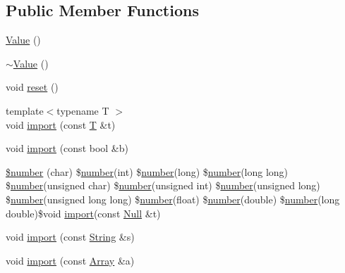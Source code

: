 \subsection*{Public Member Functions}
\begin{DoxyCompactItemize}
\item 
\hyperlink{classjsonxx_1_1_value_a57931515270809031ef1add1665a4cfd}{Value} ()
\item 
\hyperlink{classjsonxx_1_1_value_af789a314d0a4a9c98b64ec9325ac61e4}{$\sim$\+Value} ()
\item 
void \hyperlink{classjsonxx_1_1_value_ae02ba9a56af7a601ea2f2879d068153e}{reset} ()
\item 
{\footnotesize template$<$typename T $>$ }\\void \hyperlink{classjsonxx_1_1_value_ad12e7a5b0cb284a7ccdd3daf446091af}{import} (const \hyperlink{http__parser_8c_ad24d0de3f597ca60dd95c4bc59c2ff73}{T} \&t)
\item 
void \hyperlink{classjsonxx_1_1_value_ae78fbbab5fda5a42b854ca9d4d52a5eb}{import} (const bool \&b)
\item 
\hyperlink{classjsonxx_1_1_value_a8316ec94dc82e1f7affeea6ca9d7ac28}{\$number} (char) \$\hyperlink{msg__server_2jsonxx_8h_a590bcfd46c7e83d5b834775f77aa42a3}{number}(int) \$\hyperlink{msg__server_2jsonxx_8h_a590bcfd46c7e83d5b834775f77aa42a3}{number}(long) \$\hyperlink{msg__server_2jsonxx_8h_a590bcfd46c7e83d5b834775f77aa42a3}{number}(long long) \$\hyperlink{msg__server_2jsonxx_8h_a590bcfd46c7e83d5b834775f77aa42a3}{number}(unsigned char) \$\hyperlink{msg__server_2jsonxx_8h_a590bcfd46c7e83d5b834775f77aa42a3}{number}(unsigned int) \$\hyperlink{msg__server_2jsonxx_8h_a590bcfd46c7e83d5b834775f77aa42a3}{number}(unsigned long) \$\hyperlink{msg__server_2jsonxx_8h_a590bcfd46c7e83d5b834775f77aa42a3}{number}(unsigned long long) \$\hyperlink{msg__server_2jsonxx_8h_a590bcfd46c7e83d5b834775f77aa42a3}{number}(float) \$\hyperlink{msg__server_2jsonxx_8h_a590bcfd46c7e83d5b834775f77aa42a3}{number}(double) \$\hyperlink{msg__server_2jsonxx_8h_a590bcfd46c7e83d5b834775f77aa42a3}{number}(long double)\$void \hyperlink{classjsonxx_1_1_value_ad12e7a5b0cb284a7ccdd3daf446091af}{import}(const \hyperlink{structjsonxx_1_1_null}{Null} \&t)
\item 
void \hyperlink{classjsonxx_1_1_value_a23c261aa7829fe8f372e1e2ede7dc007}{import} (const \hyperlink{namespacejsonxx_a29c7a7494bb75c227bdbd208dc80a09f}{String} \&s)
\item 
void \hyperlink{classjsonxx_1_1_value_a2da69844568f4af69f14a2ea78184e7e}{import} (const \hyperlink{classjsonxx_1_1_array}{Array} \&a)

\end{DoxyCompactItemize}
